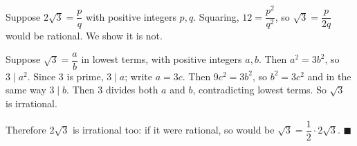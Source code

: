 Suppose $2\sqrt3=\dfrac {p}{q}$ with positive integers $p,q$. Squaring, $12=\dfrac{p^2}{q^2}$, so $\sqrt3=\dfrac{p}{2q}$ would be rational. We show it is not.

Suppose $\sqrt3=\dfrac {a}{b}$ in lowest terms, with positive integers $a,b$. Then $a^2=3b^2$, so $3\mid a^2$. Since $3$ is prime, $3\mid a$; write $a=3c$. Then $9c^2=3b^2$, so $b^2=3c^2$ and in the same way $3\mid b$. Then $3$ divides both $a$ and $b$, contradicting lowest terms. So $\sqrt3$ is irrational.

Therefore $2\sqrt3$ is irrational too: if it were rational, so would be $\sqrt3=\dfrac{1}{2}\cdot2\sqrt3$. $\blacksquare$
